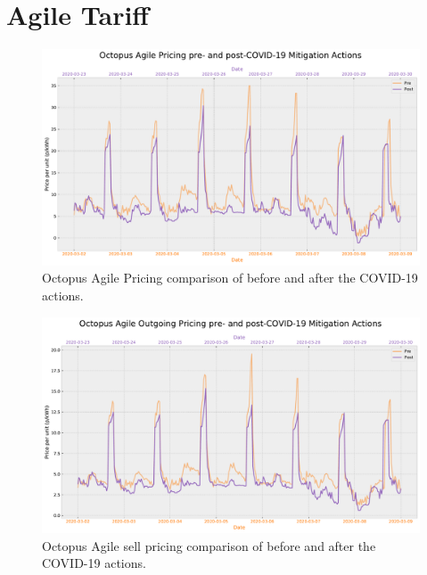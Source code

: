 \documentclass[energies,article,submit,moreauthors,pdftex]{Definitions/mdpi}
\begin{document}
\appendix
\section{Agile Tariff}

\begin{figure}[H]
\centering
\hspace{-25pt}\includegraphics[width=15 cm]{Graphics/Pre-post_Agilecomp.pdf}
\caption{Octopus Agile Pricing comparison of before and after the COVID-19 actions.}\label{fig:agile_comp_prepost}
\end{figure}

\begin{figure}[H]\centering
\hspace{-25pt}\includegraphics[width=15 cm]{Graphics/Pre-post_AgileOUTGO_comp.pdf}
\caption{Octopus Agile sell pricing comparison of before and after the COVID-19 actions.}\label{fig:agile_OUT_comp_prepost}
\end{figure}  
\end{document}
